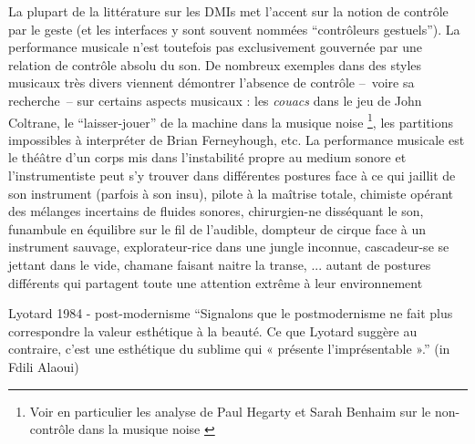 \noindent La plupart de la littérature sur les \glspl{DMI} met l'accent sur la notion de contrôle par le geste (et les interfaces y sont souvent nommées ``contrôleurs gestuels''). La performance musicale n'est toutefois pas exclusivement gouvernée par une relation de contrôle absolu du son. De nombreux exemples dans des styles musicaux très divers viennent démontrer l'absence de contrôle --~voire sa recherche~-- sur certains aspects musicaux : les \textit{couacs} dans le jeu de John Coltrane, le ``laisser-jouer'' de la machine dans la musique noise \footnote{Voir en particulier les analyse de Paul Hegarty et Sarah Benhaim sur le non-contrôle dans la musique noise \cite{hegarty_noise_2007, benhaim_aux_2018}}, les partitions impossibles à interpréter de Brian Ferneyhough, etc. La performance musicale est le théâtre d'un corps mis dans l'instabilité propre au medium sonore et l'instrumentiste peut s'y trouver dans différentes postures face à ce qui jaillit de son instrument (parfois à son insu), pilote à la maîtrise totale, chimiste opérant des mélanges incertains de fluides sonores, chirurgien-ne disséquant le son, funambule en équilibre sur le fil de l'audible, dompteur de cirque face à un instrument sauvage, explorateur-rice dans une jungle inconnue, cascadeur-se se jettant dans le vide, chamane faisant naitre la transe, ... autant de postures différents qui partagent toute une attention extrême à leur environnement


Lyotard 1984 - post-modernisme ``Signalons que le postmodernisme ne fait plus correspondre la valeur esthétique à la beauté. Ce que Lyotard suggère au contraire, c’est une esthétique du sublime qui « présente l’imprésentable ».'' (in Fdili Alaoui)



